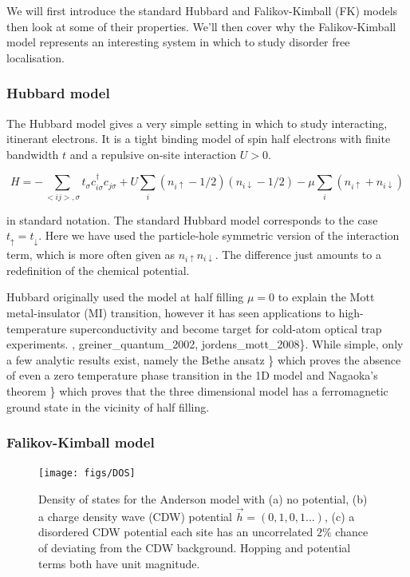 We will first introduce the standard Hubbard and Falikov-Kimball (FK)
models then look at some of their properties. We'll then cover why the
Falikov-Kimball model represents an interesting system in which to study
disorder free localisation.

\hypertarget{hubbard-model}{%
\subsubsection{Hubbard model}\label{hubbard-model}}

The Hubbard model gives a very simple setting in which to study
interacting, itinerant electrons. It is a tight binding model of spin
half electrons with finite bandwidth \(t\) and a repulsive on-site
interaction \(U > 0\).

\[
    H = -\sum_{<ij>,\sigma} t_{\sigma} c^\dagger_{i\sigma}c_{j\sigma} + U \sum_{i} (n_{i \uparrow} - 1/2)( n_{i\downarrow} - 1/2) - \mu \sum_i \left( n_{i \uparrow} + n_{i \downarrow} \right)
\]

in standard notation. The standard Hubbard model corresponds to the case
\(t_{\uparrow} = t_{\downarrow}\). Here we have used the particle-hole
symmetric version of the interaction term, which is more often given as
\(n_{i \uparrow} n_{i\downarrow}\). The difference just amounts to a
redefinition of the chemical potential.

Hubbard originally used the model at half filling \(\mu = 0\) to explain
the Mott metal-insulator (MI) transition, however it has seen
applications to high-temperature superconductivity and become target for
cold-atom optical trap experiments. \textcite{noauthor_hubbard_2013},
greiner\_quantum\_2002, jordens\_mott\_2008\}. While simple, only a few
analytic results exist, namely the Bethe ansatz
\textcite{lieb_absence_1968}\} which proves the absence of even a zero
temperature phase transition in the 1D model and Nagaoka's theorem
\textcite{nagaoka_ferromagnetism_1966}\} which proves that the three
dimensional model has a ferromagnetic ground state in the vicinity of
half filling.

\hypertarget{falikov-kimball-model}{%
\subsubsection{Falikov-Kimball model}\label{falikov-kimball-model}}

\begin{figure}
  \centering
    \texttt{[image: figs/DOS]}
  \caption{Density of states for the Anderson model with (a) no potential, (b) a charge density wave (CDW) potential $\vec{h} = (0,1,0,1...)$, (c) a disordered CDW potential each site has an uncorrelated $2\%$ chance of deviating from the CDW background. Hopping and potential terms both have unit magnitude.}
  \label{fig:fk_dos}
\end{figure}

